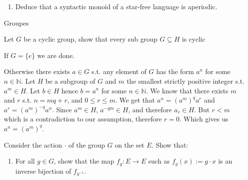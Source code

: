 \documentclass[a4paper,11pt]{exam}
\newcommand{\N}{\mathbb{N}}
\begin{document}
\begin{questions}
\begin{enumerate}[resume]
\begin{enumerate}
        \item Deduce that a syntactic monoid of a star-free language is aperiodic.
      \end{enumerate}
   

  \end{enumerate}

 \begin{EnvFullwidth}
	\colorbox{gris}{
		\begin{minipage}[c]{\textwidth}
			Groupes
		\end{minipage}
	}
\end{EnvFullwidth}


\question
Let $G$ be a cyclic group, show that every sub group $G\subseteq H$ is cyclic

\begin{solution}
	If $G=\{e\}$ we are done. 
	
	Otherwise there exists $a\in G$ s.t. any element of $G$ has the form $a^n$ for some $n\in\N$. Let $H$ be a subgroup of $G$ and  $m$ the smallest strictly positive integer s.t. $a^m\in H$.
	Let $b\in H$ hence $b=a^n$ for some $n\in \N$. We know that there exists $m$ and $r$ s.t. $n=mq+r $, and $0\leq r\leq m$. 
	We get that $a^n=(a^m)^qa^r$ and $a^r=(a^m)^{-q}a^n$. Since $a^m\in H$, $a^{-qm}\in H$, and therefore $a_r\in H$. But $r<m$ which is a contradiction to our assumption, therefore $r=0$.
	Which gives us $a^n = (a^m)^q$.
	
\end{solution}


\question
Consider the action $\cdot$ of the group $G$ on the set $E$.
Show that:

\begin{enumerate}
	\item For all $g \in G$, show that the map $f_g : E \to E$ such as
	$f_g(x) := g \cdot x$ is an inverse bijection of $f_{g^{-1}}$.
	

\end{enumerate}
\end{questions}
\end{document}

